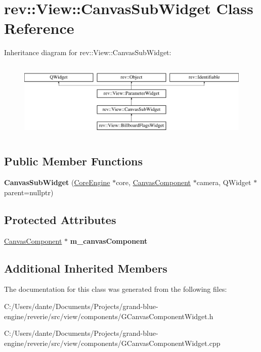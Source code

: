 \hypertarget{classrev_1_1_view_1_1_canvas_sub_widget}{}\section{rev\+::View\+::Canvas\+Sub\+Widget Class Reference}
\label{classrev_1_1_view_1_1_canvas_sub_widget}
Inheritance diagram for rev\+::View\+::Canvas\+Sub\+Widget\+:\begin{figure}[H]
\begin{center}
\leavevmode
\includegraphics[height=3.771044cm]{classrev_1_1_view_1_1_canvas_sub_widget}
\end{center}
\end{figure}
\subsection*{Public Member Functions}
\begin{DoxyCompactItemize}
\item 
\mbox{\label{classrev_1_1_view_1_1_canvas_sub_widget_a68024e9f8d32aaf9276051ad4cf7a321}} 
{\bfseries Canvas\+Sub\+Widget} (\mbox{\hyperlink{classrev_1_1_core_engine}{Core\+Engine}} $\ast$core, \mbox{\hyperlink{classrev_1_1_canvas_component}{Canvas\+Component}} $\ast$camera, Q\+Widget $\ast$parent=nullptr)
\end{DoxyCompactItemize}
\subsection*{Protected Attributes}
\begin{DoxyCompactItemize}
\item 
\mbox{\label{classrev_1_1_view_1_1_canvas_sub_widget_a489864c0a9b82627a60c2ef6d2fa4574}} 
\mbox{\hyperlink{classrev_1_1_canvas_component}{Canvas\+Component}} $\ast$ {\bfseries m\+\_\+canvas\+Component}
\end{DoxyCompactItemize}
\subsection*{Additional Inherited Members}


The documentation for this class was generated from the following files\+:\begin{DoxyCompactItemize}
\item 
C\+:/\+Users/dante/\+Documents/\+Projects/grand-\/blue-\/engine/reverie/src/view/components/G\+Canvas\+Component\+Widget.\+h\item 
C\+:/\+Users/dante/\+Documents/\+Projects/grand-\/blue-\/engine/reverie/src/view/components/G\+Canvas\+Component\+Widget.\+cpp\end{DoxyCompactItemize}
